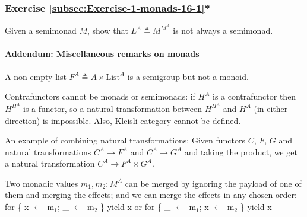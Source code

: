 \subsubsection{Exercise \label{subsec:Exercise-1-monads-16-1}\ref{subsec:Exercise-1-monads-16-1}{*}}

Given a semimonad $M$, show that $L^{A}\triangleq M^{M^{A}}$ is
not always a semimonad.

\paragraph{Addendum: Miscellaneous remarks on monads}

A non-empty list $F^{A}\triangleq A\times\text{List}^{A}$ is a semigroup
but not a monoid.

\begin{comment}
Any polynomial functor $F^{A}\triangleq p(A)$ can be made into a
monad when $p(x)$ is a polynomial of the form $p(x)=x^{n_{1}}+x^{n_{2}}+...+x^{n_{k}}$
for some positive integers $n_{1}$, ..., $n_{k}$. Indeed, any $F^{A}$
of this form may be built from the identity monad via constructions
3 and 5. To illustrate this, denote $E_{1}\equiv1$, $E_{n+1}\triangleq1+E_{n}$.
Monoid construction 2 makes $E_{n}$ into monoids. Then the monads
$E_{n}\rightarrow A$ (reader) and $E_{n}\times A$ (writer) are equivalent
to polynomial monads $A\times...\times A$ and $A+...+A$.
\end{comment}

Contrafunctors cannot be monads or semimonads: if $H^{A}$ is a contrafunctor
then $H^{H^{A}}$ is a functor, so a natural transformation between
$H^{H^{A}}$ and $H^{A}$ (in either direction) is impossible. Also,
Kleisli category cannot be defined.

An example of combining natural transformations: Given functors $C$,
$F$, $G$ and natural transformations $C^{A}\rightarrow F^{A}$ and
$C^{A}\rightarrow G^{A}$ and taking the product, we get a natural
transformation $C^{A}\rightarrow F^{A}\times G^{A}$. 

\begin{comment}
If $M^{A}$ is a monad then $M^{M^{A}}$ is not automatically a monad
(need counterexample?). $M^{A}\triangleq\bbnum 1+A$ should be sufficient;
show that $M\circ M\circ M$ is reduced to $M\circ M$ in two inequivalent
ways.
\end{comment}

Two monadic values $m_{1},m_{2}:M^{A}$ can be merged by ignoring
the payload of one of them and merging the effects; and we can merge
the effects in any chosen order: for \{ x $\leftarrow$ m$_{1}$;
\_ $\leftarrow$ m$_{2}$ \} yield x or for \{ \_ $\leftarrow$ m$_{1}$;
x $\leftarrow$ m$_{2}$ \} yield x 

